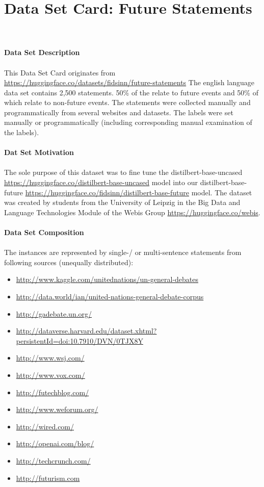 \section{Data Set Card: Future Statements}
\\
\\
\textbf{Data Set Description}
\\
\\
This Data Set Card originates from \url{https://huggingface.co/datasets/fidsinn/future-statements}
The english language data set contains 2,500 statements.
50\% of the relate to future events and 50\% of which relate to non-future events.
The statements were collected manually and programmatically from several websites and datasets.
The labels were set manually or programmatically (including corresponding manual examination of the labels).
\\
\\
\textbf{Dat Set Motivation}
\\
\\
The sole purpose of this dataset was to fine tune the distilbert-base-uncased \url{https://huggingface.co/distilbert-base-uncased} model into our distilbert-base-future \url{https://huggingface.co/fidsinn/distilbert-base-future} model.
The dataset was created by students from the University of Leipzig in the Big Data and Language Technologies Module of the Webis Group \url{https://huggingface.co/webis}.
\\
\\
\textbf{Data Set Composition}
\\
\\
The instances are represented by single-/ or multi-sentence statements from following sources (unequally distributed):
%
\begin{itemize}
    \item \url{http://www.kaggle.com/unitednations/un-general-debates}
    \item \url{http://data.world/ian/united-nations-general-debate-corpus}
    \item \url{http://gadebate.un.org/}
    \item \url{http://dataverse.harvard.edu/dataset.xhtml?persistentId=doi:10.7910/DVN/0TJX8Y}
    \item \url{http://www.wsj.com/}
    \item \url{http://www.vox.com/}
    \item \url{http://futechblog.com/}
    \item \url{http://www.weforum.org/}
    \item \url{http://wired.com/}
    \item \url{http://openai.com/blog/}
    \item \url{http://techcrunch.com/}
    \item \url{http://futurism.com}
\end{itemize}
